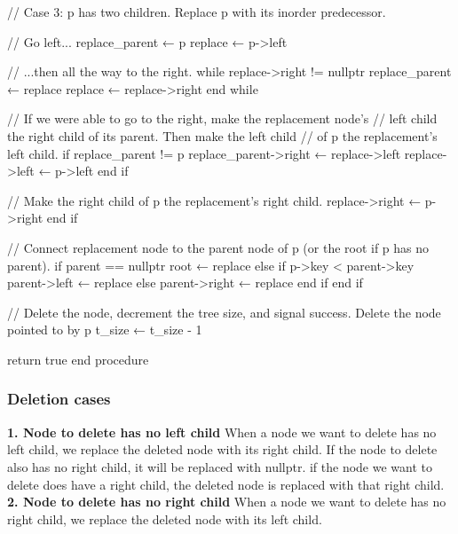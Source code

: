 \documentclass{report}
\begin{document}
    \begin{cppcode}
        // Case 3: p has two children. Replace p with its inorder predecessor.
        
        // Go left...
        replace_parent ← p
        replace ← p->left
        
        // ...then all the way to the right.
        while replace->right != nullptr
            replace_parent ← replace
            replace ← replace->right
        end while
        
        // If we were able to go to the right, make the replacement node's
        // left child the right child of its parent. Then make the left child
        // of p the replacement's left child.
        if replace_parent != p
            replace_parent->right ← replace->left
            replace->left ← p->left
        end if
        
        // Make the right child of p the replacement's right child.
        replace->right ← p->right
    end if
    
    // Connect replacement node to the parent node of p (or the root if p has no parent).    
    if parent == nullptr
        root ← replace
    else
        if p->key < parent->key
            parent->left ← replace
        else
            parent->right ← replace
        end if
    end if

    // Delete the node, decrement the tree size, and signal success.
    Delete the node pointed to by p
    t_size ← t_size - 1

    return true
end procedure
    \end{cppcode}

    \pagebreak 
    \subsubsection{Deletion cases}
    \bigbreak \noindent 
    \textbf{1. Node to delete has no left child}
    \bigbreak \noindent 
    When a node we want to delete has no left child, we replace the deleted node with its right child. If the node to delete also has no right child, it will be replaced with nullptr.
    \bigbreak \noindent 
    if the node we want to delete does have a right child, the deleted node is replaced with that right child.
    \bigbreak \noindent 
    \textbf{2. Node to delete has no right child}
    \bigbreak \noindent 
    When a node we want to delete has no right child, we replace the deleted node with its left child.
\end{document}
